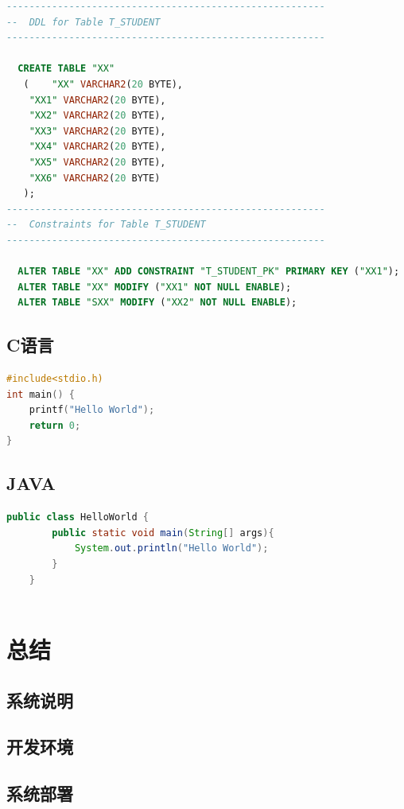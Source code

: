 \documentclass[UTF8]{ctexart}
\numberwithin{figure}{section}
\begin{document}
\begin{lstlisting}[language=SQL,escapeinside=``]
--------------------------------------------------------
--  DDL for Table T_STUDENT
--------------------------------------------------------

  CREATE TABLE "XX" 
   (	"XX" VARCHAR2(20 BYTE), 
	"XX1" VARCHAR2(20 BYTE), 
	"XX2" VARCHAR2(20 BYTE), 
	"XX3" VARCHAR2(20 BYTE), 
	"XX4" VARCHAR2(20 BYTE), 
	"XX5" VARCHAR2(20 BYTE), 
	"XX6" VARCHAR2(20 BYTE)
   );
--------------------------------------------------------
--  Constraints for Table T_STUDENT
--------------------------------------------------------

  ALTER TABLE "XX" ADD CONSTRAINT "T_STUDENT_PK" PRIMARY KEY ("XX1");
  ALTER TABLE "XX" MODIFY ("XX1" NOT NULL ENABLE);
  ALTER TABLE "SXX" MODIFY ("XX2" NOT NULL ENABLE);

\end{lstlisting}


\subsection{C语言}
\begin{lstlisting}[language=C,escapeinside=``]
#include<stdio.h)
int main() {
	printf("Hello World");
	return 0;
}
\end{lstlisting}
\subsection{JAVA}
\begin{lstlisting}[language=JAVA,escapeinside=``]
	public class HelloWorld {
		public static void main(String[] args){
			System.out.println("Hello World");
		}
	}
	
\end{lstlisting}



\newpage
\section{总结}

\newpage
\begin{appendices}
	\section{系统说明}

	\subsection{开发环境}

	\subsection{系统部署}

\end{appendices}
\end{document}
